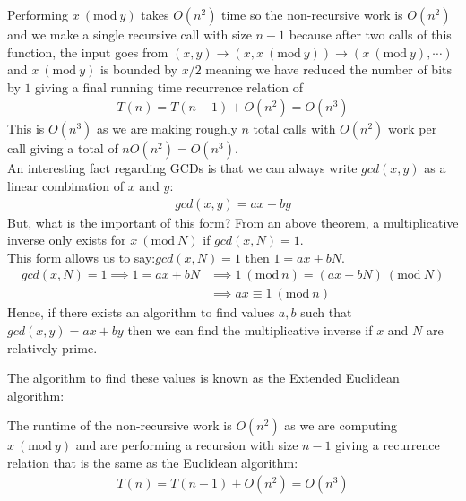 \documentclass[14pt]{extarticle}
\newcommand{\Mod}[1]{\ (\mathrm{mod}\ #1)}
\begin{document}
    Performing $x\Mod{y}$ takes $O(n^2)$ time so the non-recursive work is
    $O(n^2)$ and we make a single recursive call with size $n - 1$ because
    after two calls of this function, the input goes from $(x, y)
    \to (x, x \Mod{y}) \to (x\Mod{y}, \cdots)$ and $x\Mod{y}$ is bounded by
    $x / 2$ meaning we have reduced the number of bits by $1$ giving a final
    running time recurrence relation of
    \begin{align*}
        T(n) = T(n - 1) + O(n^2) = O(n^3)
    \end{align*}
    This is $O(n^3)$ as we are making roughly $n$ total calls with $O(n^2)$
    work per call giving a total of $nO(n^2) = O(n^3)$.\\


    An interesting fact regarding GCDs is that we can always write
    $gcd(x, y)$ as a linear combination of $x$ and $y$:
    \begin{align*}
        gcd(x, y) = ax + by
    \end{align*}
    But, what is the important of this form? From an above theorem, a 
    multiplicative inverse only exists for $x\Mod{N}$ if $gcd(x, N) = 1$.\\

    This form allows us to say:$gcd(x, N) = 1$ then $1 = ax + bN$.
    \begin{align*}
        gcd(x, N) = 1\implies 1 = ax + bN &\implies 1\Mod{n} = (ax + bN)\Mod{N}
                                            \\
                                          &\implies ax\equiv 1\Mod{n}
    \end{align*}
    Hence, if there exists an algorithm to find values $a, b$ such that
    $gcd(x, y) = ax + by$ then we can find the multiplicative inverse if $x$
    and $N$ are relatively prime.\\

    \pagebreak 

    The algorithm to find these values is known as the Extended Euclidean
    algorithm:

    \begin{algorithm}[H]
        \Fn{\FMain{$x, y$}}{
            \If{$y = 0$}{
                \Return $x, 1, 0$
            }
            $d, a^\prime, b^\prime \gets \Call{\FMain{$y, x\Mod{y}$}}$  \\
            $a^{\prime\prime}, b^{\prime\prime} \gets 
                b^\prime, a^\prime - \left\lfloor \dfrac{x}{y} \right\rfloor
                \cdot b^\prime$                                         \\
            \Return $d, a^{\prime\prime}, b^{\prime\prime}$
        }
    \end{algorithm}

    The runtime of the non-recursive work is $O(n^2)$ as we are computing
    $x\Mod{y}$ and are performing a recursion with size $n - 1$ giving a
    recurrence relation that is the same as the Euclidean algorithm:
    \begin{align*}
        T(n) = T(n - 1) + O(n^2) = O(n^3)
    \end{align*}
\end{document}

